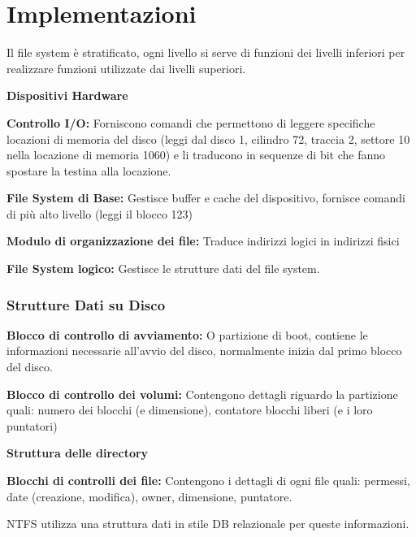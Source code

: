 \section{Implementazioni}
Il file system è stratificato, ogni livello si serve di funzioni dei livelli inferiori per realizzare funzioni utilizzate dai livelli superiori.

\begin{sitemize}
    \item \textbf{Dispositivi Hardware}
    \item \textbf{Controllo I/O:} Forniscono comandi che permettono di leggere specifiche locazioni di memoria del disco (leggi dal disco 1, cilindro 72, traccia 2, settore 10 nella locazione di memoria 1060) e li traducono in sequenze di bit che fanno spostare la testina alla locazione.

    \item \textbf{File System di Base:} Gestisce buffer e cache del dispositivo, fornisce comandi di più alto livello (leggi il blocco 123)
    \item \textbf{Modulo di organizzazione dei file:} Traduce indirizzi logici in indirizzi fisici
    \item \textbf{File System logico:} Gestisce le strutture dati del file system.
\end{sitemize}

\subsubsection*{Strutture Dati su Disco}
\begin{sitemize}
    \item \textbf{Blocco di controllo di avviamento:} O partizione di boot, contiene le informazioni necessarie all'avvio del disco, normalmente inizia dal primo blocco del disco.
    \item \textbf{Blocco di controllo dei volumi:} Contengono dettagli riguardo la partizione quali: numero dei blocchi (e dimensione), contatore blocchi liberi (e i loro puntatori)
    \item \textbf{Struttura delle directory}
    \item \textbf{Blocchi di controlli dei file:} Contengono i dettagli di ogni file quali: permessi, date (creazione, modifica), owner, dimensione, puntatore.

    NTFS utilizza una struttura dati in stile DB relazionale per queste informazioni.
\end{sitemize}

